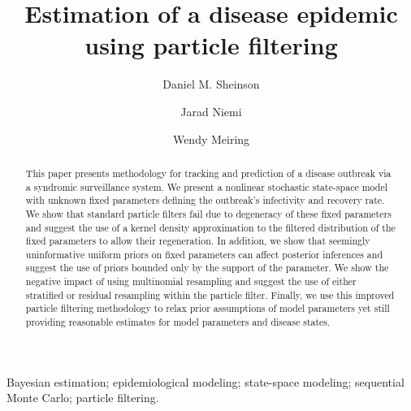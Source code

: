 \documentclass{elsarticle}
\begin{document}
\begin{frontmatter}

\title{Estimation of a disease epidemic using particle filtering}

\author[danny]{Daniel M. Sheinson}
\author[jarad]{Jarad Niemi}
\author[wendy]{Wendy Meiring}

\address[danny]{Corresponding author -- Department of Statistics and Applied Probability, University of Califonia--Santa Barbara, \\
 Santa Barbara, CA, U.S.A., sheinson@pstat.ucsb.edu, 1-847-609-7824}
 \address[jarad]{Department of Statistics, Iowa State University, Ames, IA, U.S.A., niemi@iastate.edu}
 \address[wendy]{Department of Statistics and Applied Probability, University of Califonia--Santa Barbara, \\
 Santa Barbara, CA, U.S.A., meiring@pstat.ucsb.edu}

\begin{abstract}
This paper presents methodology for tracking and prediction of a disease outbreak via a syndromic surveillance system. We present a nonlinear stochastic state-space model with unknown fixed parameters defining the outbreak's infectivity and recovery rate. We show that standard particle filters fail due to degeneracy of these fixed parameters and suggest the use of a kernel density approximation to the filtered distribution of the fixed parameters to allow their regeneration. In addition, we show that seemingly uninformative uniform priors on fixed parameters can affect posterior inferences and suggest the use of priors bounded only by the support of the parameter. We show the negative impact of using multinomial resampling and suggest the use of either stratified or residual resampling within the particle filter. Finally, we use this improved particle filtering methodology to relax prior assumptions of model parameters yet still providing reasonable estimates for model parameters and disease states. 
\end{abstract}


\begin{keyword}
Bayesian estimation; epidemiological modeling; state-space modeling; sequential Monte Carlo; particle filtering.
\end{keyword}

\end{frontmatter}

\let\thefootnote\relax{}
\end{document}
